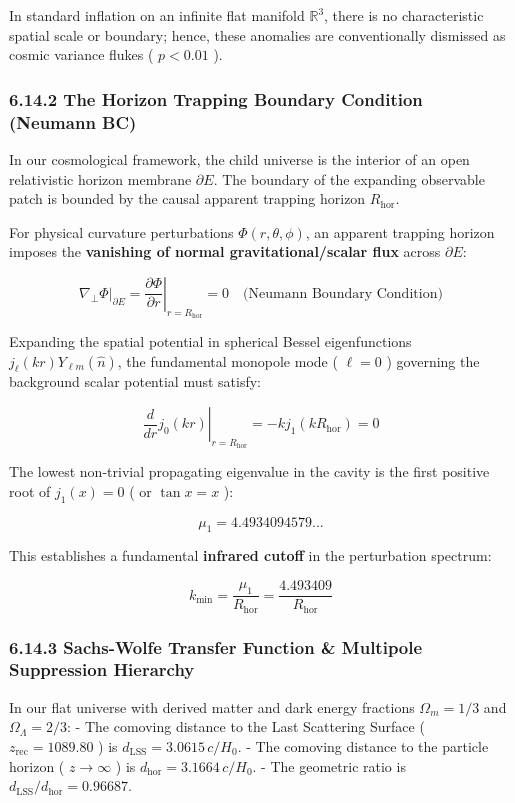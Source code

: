 \documentclass[11pt,a4paper]{article}
\theoremstyle{definition}
\theoremstyle{remark}
\begin{document}
In standard inflation on an infinite flat manifold $\mathbb{R}^3$, there is no characteristic spatial scale or boundary; hence, these anomalies are conventionally dismissed as cosmic variance flukes ( $p < 0.01$ ).

\subsubsection{6.14.2 The Horizon Trapping Boundary Condition (Neumann BC)}
In our cosmological framework, the child universe is the interior of an open relativistic horizon membrane $\partial E$. The boundary of the expanding observable patch is bounded by the causal apparent trapping horizon $R_{\text{hor}}$.

For physical curvature perturbations $\Phi(r, \theta, \phi)$, an apparent trapping horizon imposes the \textbf{vanishing of normal gravitational/scalar flux} across $\partial E$:


\begin{equation}
\left. \nabla_\perp \Phi \right|_{\partial E} = \left. \frac{\partial \Phi}{\partial r} \right|_{r = R_{\text{hor}}} = 0 \quad \text{(Neumann Boundary Condition)}
\end{equation}


Expanding the spatial potential in spherical Bessel eigenfunctions $j_\ell(kr) Y_{\ell m}(\hat{n})$, the fundamental monopole mode ( $\ell = 0$ ) governing the background scalar potential must satisfy:


\begin{equation}
\left. \frac{d}{dr} j_0(kr) \right|_{r = R_{\text{hor}}} = -k j_1(k R_{\text{hor}}) = 0
\end{equation}


The lowest non-trivial propagating eigenvalue in the cavity is the first positive root of $j_1(x) = 0$ ( or $\tan x = x$ ):


\begin{equation}
\mu_1 = 4.4934094579...
\end{equation}


This establishes a fundamental \textbf{infrared cutoff} in the perturbation spectrum:


\begin{equation}
k_{\text{min}} = \frac{\mu_1}{R_{\text{hor}}} = \frac{4.493409}{R_{\text{hor}}}
\end{equation}


\subsubsection{6.14.3 Sachs-Wolfe Transfer Function \& Multipole Suppression Hierarchy}
In our flat universe with derived matter and dark energy fractions $\Omega_m = 1/3$ and $\Omega_\Lambda = 2/3$:
- The comoving distance to the Last Scattering Surface ( $z_{\text{rec}} = 1089.80$ ) is $d_{\text{LSS}} = 3.0615 \, c/H_0$.
- The comoving distance to the particle horizon ( $z \to \infty$ ) is $d_{\text{hor}} = 3.1664 \, c/H_0$.
- The geometric ratio is $d_{\text{LSS}} / d_{\text{hor}} = 0.96687$.
\end{document}
